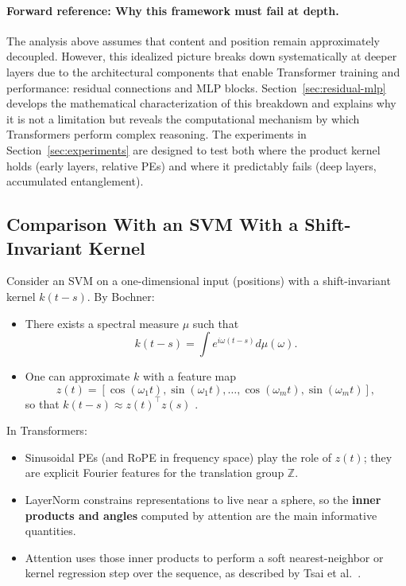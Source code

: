\documentclass[11pt]{article}
\theoremstyle{definition}
\begin{document}
\paragraph{Forward reference: Why this framework must fail at depth.}
The analysis above assumes that content and position remain approximately decoupled. However, this idealized picture breaks down systematically at deeper layers due to the architectural components that enable Transformer training and performance: residual connections and MLP blocks. Section~\ref{sec:residual-mlp} develops the mathematical characterization of this breakdown and explains why it is not a limitation but reveals the computational mechanism by which Transformers perform complex reasoning. The experiments in Section~\ref{sec:experiments} are designed to test both where the product kernel holds (early layers, relative PEs) and where it predictably fails (deep layers, accumulated entanglement).

\subsection{Comparison With an SVM With a Shift-Invariant Kernel}

Consider an SVM on a one-dimensional input (positions) with a shift-invariant kernel \(k(t-s)\). By Bochner:

\begin{itemize}
    \item There exists a spectral measure \(\mu\) such that
    \[
    k(t-s) = \int e^{i\omega(t-s)} d\mu(\omega).
    \]
    \item One can approximate \(k\) with a feature map
    \[
    z(t) = [\cos(\omega_1 t), \sin(\omega_1 t), \dots, \cos(\omega_m t), \sin(\omega_m t)],
    \]
    so that $k(t-s) \approx z(t)^\top z(s)$ \cite{rahimi2007random}.
\end{itemize}

In Transformers:

\begin{itemize}
    \item Sinusoidal PEs (and RoPE in frequency space) play the role of \(z(t)\); they are explicit Fourier features for the translation group \(\mathbb{Z}\).
    \item LayerNorm constrains representations to live near a sphere, so the \textbf{inner products and angles} computed by attention are the main informative quantities.
    \item Attention uses those inner products to perform a soft nearest-neighbor or kernel regression step over the sequence, as described by Tsai et al.\ \cite{tsai2019transformer}.
\end{itemize}
\end{document}
